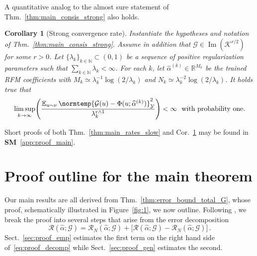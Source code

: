\documentclass{article}
\theoremstyle{plain}
\newtheorem{corollary}[theorem]{Corollary}
\theoremstyle{my_def}
\theoremstyle{my_rem}
\numberwithin{equation}{section}
\numberwithin{theorem}{section}%
\newcommand{\R}{\mathbb{R}}
\newcommand{\E}{\mathbb{E}}
\newcommand{\N}{\mathbb{N}}
\newcommand{\scrR}{\mathscr{R}}
\newcommand{\cG}{\mathcal{G}}
\newcommand{\cK}{\mathcal{K}}
\newcommand{\cY}{\mathcal{Y}}
\let\originalleft\left %
\let\originalright\right
\renewcommand{\left}{\mathopen{}\mathclose\bgroup\originalleft}
\renewcommand{\right}{\aftergroup\egroup\originalright}
\newcommand{\norm}{\normtemp}
\renewcommand{\hat}{\widehat}
\newcommand{\mmin}{\wedge} %
\DeclareMathOperator{\image}{Im} %
\renewcommand{\E}{\operatorname{\mathbb{E}}} %
\newcommand{\al}{\alpha}
\newcommand{\alhat}{\hat{\al}}
\begin{document}
A quantitative analog to the almost sure statement of Thm.~\ref{thm:main_consis_strong} also holds.
\begin{corollary}[Strong convergence rate]
\label{cor:main_rates_strong}
Instantiate the hypotheses and notation of Thm.~\ref{thm:main_consis_strong}. Assume in addition that $\cG\in \image(\cK^{r/2})$ for some $r>0$. Let $\{\lambda_k\}_{k\in\N}\subset (0,1)$ be a sequence of positive regularization parameters such that $\sum_{k\in \N} \lambda_k < \infty$. For each $k$, let $\alhat^{(k)}\in\R^{M_k}$ be the trained RFM coefficients with $M_k\simeq \lambda_k^{-1} \log(2/\lambda_k)$ and $N_k \simeq \lambda_k^{-2} \log(2/\lambda_k)$. It holds true that
\begin{equation}\label{eq:main_rates_strong}
    \limsup_{k\to \infty} \left(\frac{\E_{u\sim\nu}\norm{\cG(u) - \Phi(u;\alhat^{(k)})}_{\cY}^2}{\lambda_k^{r\mmin 1}}\right) <\infty\ \ \text{with probability one.}
\end{equation}
\end{corollary}
Short proofs of both Thm.~\ref{thm:main_rates_slow} and Cor.~\ref{cor:main_rates_strong} may be found in {\bf SM}~\ref{app:proof_main}.



\section{Proof outline for the main theorem}\label{sec:proof}

Our main results are all derived from Thm.~\ref{thm:error_bound_total_G}, whose proof, schematically illustrated in Figure~\ref{fig:1}, we now outline. Following \cite{RR2008}, we break the proof into several steps that arise from the error decomposition
\begin{equation}\label{eq:proof_decomp}
    \scrR(\hat{\alpha};\cG)=\scrR_N(\hat{\alpha};\cG) + \bigl[\scrR(\hat{\alpha};\cG)-\scrR_N(\hat{\alpha};\cG)\bigr]\,.
\end{equation}
Sect.~\ref{sec:proof_emp} estimates the first term on the right hand side of~\eqref{eq:proof_decomp} while Sect.~\ref{sec:proof_gen} estimates the second.
\end{document}
